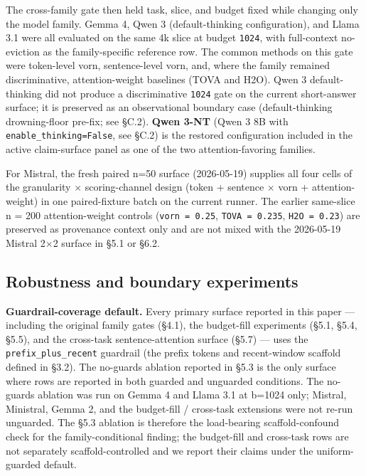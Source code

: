 \documentclass[10pt]{article}
\begin{document}
The cross-family gate then held task, slice, and budget fixed while
changing only the model family. Gemma 4, Qwen 3 (default-thinking
configuration), and Llama 3.1 were all evaluated on the same 4k slice
at budget \texttt{1024}, with full-context no-eviction as the
family-specific reference row. The common methods on this gate were
token-level vorn, sentence-level vorn, and, where the family remained
discriminative, attention-weight baselines (TOVA and H2O). Qwen 3
default-thinking did not produce a discriminative \texttt{1024} gate
on the current short-answer surface; it is preserved as an
observational boundary case (default-thinking drowning-floor pre-fix;
see \S{}C.2). \textbf{Qwen 3-NT} (Qwen 3 8B with
\texttt{enable\_thinking=False}, see \S{}C.2) is the restored
configuration included in the active claim-surface panel as one of the
two attention-favoring families.

For Mistral, the fresh paired n=50 surface (2026-05-19) supplies all
four cells of the granularity $\times$ scoring-channel design (token + sentence
$\times$ vorn + attention-weight) in one paired-fixture batch on
the current runner. The earlier same-slice n = 200 attention-weight
controls (\texttt{vorn\ =\ 0.25}, \texttt{TOVA\ =\ 0.235},
\texttt{H2O\ =\ 0.23}) are preserved as provenance context only
and are not mixed with the 2026-05-19 Mistral 2$\times$2 surface in \S{}5.1 or
\S{}6.2.

\subsection{Robustness and boundary experiments}\label{42-robustness-and-boundary-experiments}

\textbf{Guardrail-coverage default.} Every primary surface reported in
this paper --- including the original family gates (\S{}4.1), the
budget-fill experiments (\S{}5.1, \S{}5.4, \S{}5.5), and the cross-task
sentence-attention surface (\S{}5.7) --- uses the
\texttt{prefix\_plus\_recent} guardrail (the prefix tokens and
recent-window scaffold defined in \S{}3.2). The no-guards ablation reported
in \S{}5.3 is the only surface where rows are reported in both guarded and
unguarded conditions. The no-guards ablation was run on Gemma 4 and
Llama 3.1 at b=1024 only; Mistral, Ministral, Gemma 2, and the
budget-fill / cross-task extensions were not re-run unguarded. The \S{}5.3
ablation is therefore the load-bearing scaffold-confound check for the
family-conditional finding; the budget-fill and cross-task rows are not
separately scaffold-controlled and we report their claims under the
uniform-guarded default.
\end{document}
